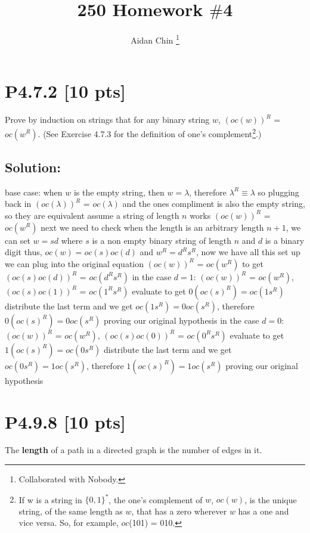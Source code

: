 \documentclass[12pt]{article}
\title{250 Homework $\#$4}
\author{Aidan Chin \footnote{Collaborated with Nobody.}}
\begin{document}
\maketitle

\section*{\textbf{P4.7.2} [10 pts]}
Prove by induction on strings that for any binary string $w$, $(oc(w))^R$ = $oc(w^R)$. (See Exercise 4.7.3 for the definition of one’s complement\footnote{If w is a string in $\{0, 1\}^*$, the one’s complement of $w$, $oc(w)$, is the unique string, of the same length as $w$, that has a zero wherever $w$ has a one and vice versa. So, for example, $oc$(101) = 010.}.)

\subsection*{\textbf{Solution:}}
base case:
when $w$ is the empty string, then $w = \lambda$, therefore $\lambda^R \equiv \lambda$ so plugging back in $(oc(\lambda))^R$ = $oc(\lambda)$ and the ones compliment is also the empty string, so they are equivalent \newline
assume a string of length $n$ works $(oc(w))^R$ = $oc(w^R)$\newline
next we need to check when the length is an arbitrary length $n+1$, we can set $w=sd$ where $s$ is a non empty binary string of length $n$ and $d$ is a binary digit 
thus, $oc(w) = oc(s)oc(d)$ and $w^R=d^Rs^R$, now we have all this set up we can plug into the original equation $(oc(w))^R$ = $oc(w^R)$ to get $(oc(s)oc(d))^R$ = $oc(d^Rs^R)$\newline
in the case $d=1$: $(oc(w))^R$ = $oc(w^R)$, $(oc(s)oc(1))^R$ = $oc(1^Rs^R)$ evaluate to get $0(oc(s)^R) = oc(1s^R)$ distribute the last term and we get $oc(1s^R) = 0oc(s^R)$, therefore $0(oc(s)^R) = 0oc(s^R)$ proving our original hypothesis \newline
in the case $d=0$: $(oc(w))^R$ = $oc(w^R)$, $(oc(s)oc(0))^R$ = $oc(0^Rs^R)$ evaluate to get $1(oc(s)^R) = oc(0s^R)$ distribute the last term and we get $oc(0s^R) = 1oc(s^R)$, therefore $1(oc(s)^R) = 1oc(s^R)$ proving our original hypothesis \newline
\newpage
\section*{\textbf{P4.9.8} [10 pts]}
The \textbf{length} of a path in a directed graph is the number of edges in it.
\end{document}

